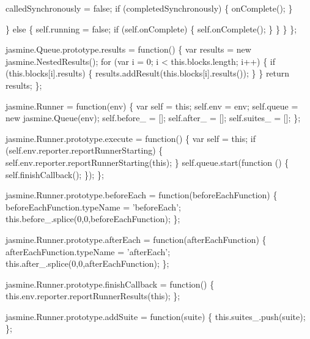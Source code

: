 \begin{DoxyCodeInclude}
      calledSynchronously = \textcolor{keyword}{false};
      \textcolor{keywordflow}{if} (completedSynchronously) \{
        onComplete();
      \}

    \} \textcolor{keywordflow}{else} \{
      \textcolor{keyword}{self}.running = \textcolor{keyword}{false};
      \textcolor{keywordflow}{if} (\textcolor{keyword}{self}.onComplete) \{
        \textcolor{keyword}{self}.onComplete();
      \}
    \}
  \}
\};

jasmine.Queue.prototype.results = \textcolor{keyword}{function}() \{
  var results = \textcolor{keyword}{new} jasmine.NestedResults();
  \textcolor{keywordflow}{for} (var i = 0; i < this.blocks.length; i++) \{
    \textcolor{keywordflow}{if} (this.blocks[i].results) \{
      results.addResult(this.blocks[i].results());
    \}
  \}
  \textcolor{keywordflow}{return} results;
\};


jasmine.Runner = \textcolor{keyword}{function}(env) \{
  var \textcolor{keyword}{self} = \textcolor{keyword}{this};
  \textcolor{keyword}{self}.env = env;
  \textcolor{keyword}{self}.queue = \textcolor{keyword}{new} jasmine.Queue(env);
  \textcolor{keyword}{self}.before\_ = [];
  \textcolor{keyword}{self}.after\_ = [];
  \textcolor{keyword}{self}.suites\_ = [];
\};

jasmine.Runner.prototype.execute = \textcolor{keyword}{function}() \{
  var \textcolor{keyword}{self} = \textcolor{keyword}{this};
  \textcolor{keywordflow}{if} (\textcolor{keyword}{self}.env.reporter.reportRunnerStarting) \{
    \textcolor{keyword}{self}.env.reporter.reportRunnerStarting(\textcolor{keyword}{this});
  \}
  \textcolor{keyword}{self}.queue.start(\textcolor{keyword}{function} () \{
    \textcolor{keyword}{self}.finishCallback();
  \});
\};

jasmine.Runner.prototype.beforeEach = \textcolor{keyword}{function}(beforeEachFunction) \{
  beforeEachFunction.typeName = \textcolor{stringliteral}{'beforeEach'};
  this.before\_.splice(0,0,beforeEachFunction);
\};

jasmine.Runner.prototype.afterEach = \textcolor{keyword}{function}(afterEachFunction) \{
  afterEachFunction.typeName = \textcolor{stringliteral}{'afterEach'};
  this.after\_.splice(0,0,afterEachFunction);
\};


jasmine.Runner.prototype.finishCallback = \textcolor{keyword}{function}() \{
  this.env.reporter.reportRunnerResults(\textcolor{keyword}{this});
\};

jasmine.Runner.prototype.addSuite = \textcolor{keyword}{function}(suite) \{
  this.suites\_.push(suite);
\};


\end{DoxyCodeInclude}
